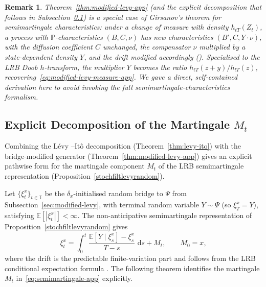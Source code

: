 \documentclass{article}
\newtheorem{rem}[thm]{Remark}
\newcommand{\levy}{{L\'evy }}
\def\P{\mathbb{P}}
\def\E{\mathbb{E}}
\def\T{\mathbb{T}}
\def\d{\,\mathrm{d}}
\theoremstyle{definition}
\begin{document}
\begin{rem}
Theorem~\ref{thm:modified-levy-app} (and the explicit decomposition that follows in Subsection~\ref{sec:explicit-decomp}) is a special case of Girsanov's theorem for semimartingale characteristics: under a change of measure with density $h_{tT}(Z_t)$, a process with $\P$-characteristics $(B, C, \nu)$ has new characteristics $(B', C, Y\cdot\nu)$, with the diffusion coefficient $C$ unchanged, the compensator $\nu$ multiplied by a state-dependent density $Y$, and the drift modified accordingly (\cite[Theorem~III.3.24]{JacodShiryaev2003}). Specialised to the LRB Doob $h$-transform, the multiplier $Y$ becomes the ratio $h_{tT}(z + y)/h_{tT}(z)$, recovering~\eqref{eq:modified-levy-measure-app}. We gave a direct, self-contained derivation here to avoid invoking the full semimartingale-characteristics formalism.
\end{rem}

\subsection{Explicit Decomposition of the Martingale $M_t$}\label{sec:explicit-decomp}

Combining the \levy--It\^{o} decomposition (Theorem~\ref{thm:levy-ito}) with the bridge-modified generator (Theorem~\ref{thm:modified-levy-app}) gives an explicit pathwise form for the martingale component $M_t$ of the LRB semimartingale representation (Proposition~\ref{stochfiltlevyrandom}).

Let $\{\xi^{x}_t\}_{t \in \T}$ be the $\delta_x$-initialised random bridge to $\Psi$ from Subsection~\ref{sec:modified-levy}, with terminal random variable $Y \sim \Psi$ (so $\xi^{x}_T = Y$), satisfying $\E[|\xi^{x}_t|] < \infty$. The non-anticipative semimartingale representation of Proposition~\ref{stochfiltlevyrandom} gives
\begin{equation}\label{eq:semimartingale-app}
  \xi^{x}_t = \int_0^t \frac{\E[Y \mid \xi^{x}_s] - \xi^{x}_s}{T - s}\,\d s + M_t,
  \qquad M_0 = x,
\end{equation}
where the drift is the predictable finite-variation part and follows from the LRB conditional expectation formula \cite[Corollary~2.10]{hoylehughstonmacrina_2011}. The following theorem identifies the martingale $M_t$ in~\eqref{eq:semimartingale-app} explicitly.
\end{document}
